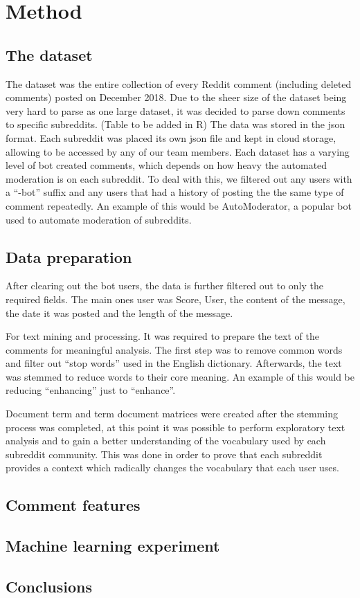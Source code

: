 \chapter{Method}\label{ch:Method}

\section{The dataset}

The dataset was the entire collection of every Reddit comment (including deleted comments) posted on December 2018. Due to the sheer size of the dataset being very hard to parse as one large dataset, it was decided to parse down comments to specific subreddits. (Table to be added in R)  The data was stored in the json format.
\newline
Each subreddit was placed its own json file and kept in cloud storage, allowing to be accessed by any of our team members. Each dataset has a varying level of bot created comments, which depends on how heavy the automated moderation is on each subreddit. To deal with this, we filtered out any users with a “-bot” suffix and any users that had a history of posting the the same type of comment repeatedly. An example of this would be AutoModerator, a popular bot used to automate moderation of subreddits. 

\section {Data preparation}
After clearing out the bot users, the data is further filtered out to only the required fields. The main ones user was Score, User, the content of the message, the date it was posted and the length of the message.

For text mining and processing. It was required to prepare the text of the comments for meaningful analysis. The first step was to remove common words and filter out “stop words” used in the English dictionary. Afterwards, the text was stemmed to reduce words to their core meaning. An example of this would be reducing “enhancing” just to “enhance”. 

Document term and term document matrices were created after the stemming process was completed, at this point it was possible to perform exploratory text analysis and to gain a better understanding of the vocabulary used by each subreddit community. This was done in order to prove that each subreddit provides a context which radically changes the vocabulary that each user uses. 

\section {Comment features}

\section {Machine learning experiment}



\section{Conclusions}




